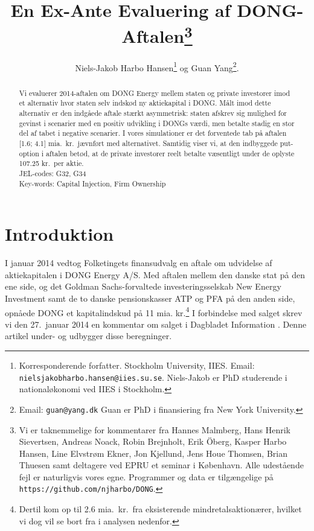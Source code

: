 \documentclass{article}
\title{En Ex-Ante Evaluering af DONG-Aftalen\thanks{Vi er taknemmelige for kommentarer fra Hannes Malmberg, Hans Henrik Sievertsen, Andreas Noack, Robin Brejnholt, Erik {\"O}berg, Kasper Harbo Hansen, Line Elvstrøm Ekner, Jon Kjellund,  Jens Houe Thomsen, Brian Thuesen samt deltagere ved EPRU et seminar i København. Alle udestående fejl er naturligvis vores egne.  Programmer og data er tilgængelige på \texttt{https://github.com/njharbo/DONG}.} \\ }
\author{Niels-Jakob Harbo Hansen\thanks{Korresponderende forfatter. Stockholm University, IIES.  Email: \texttt{nielsjakobharbo.hansen@iies.su.se}. Niels-Jakob er PhD studerende i nationaløkonomi ved IIES i Stockholm.} \hspace{0.1 mm} og Guan Yang\thanks{Email: \texttt{guan@yang.dk} Guan er PhD i finansiering fra New York University.  }. }
\begin{document}
\maketitle

\begin{abstract}
\onehalfspacing
 Vi evaluerer 2014-aftalen om DONG Energy mellem staten og private investorer imod et alternativ hvor staten selv indskød ny aktiekapital i DONG. Målt imod dette alternativ er den indgåede aftale stærkt asymmetrisk: staten afskrev sig mulighed for gevinst i scenarier med en positiv udvikling i DONGs værdi, men betalte stadig en stor del af tabet i negative scenarier. I vores simulationer er det forventede tab på aftalen [1.6; 4.1] mia.\ kr.\ jævnført med alternativet. Samtidig viser vi, at den indbyggede put-option i aftalen betød, at de private investorer reelt betalte væsentligt under de oplyste 107.25 kr.\ per aktie. \\
 JEL-codes: G32, G34 \\
 Key-words: Capital Injection, Firm Ownership
\end{abstract}


\newpage

\section{Introduktion}


I januar 2014 vedtog Folketingets finansudvalg en aftale om udvidelse af aktiekapitalen i DONG Energy A/S. Med aftalen mellem den danske stat på den ene side, og det Goldman Sachs-forvaltede investeringsselskab New Energy Investment samt de to danske pensionskasser ATP og PFA på den anden side, opnåede DONG et kapitalindskud på 11 mia. kr.\footnote{Dertil kom op til 2.6 mia.\ kr.\ fra eksisterende mindretalsaktionærer, hvilket vi dog vil se bort fra i analysen nedenfor.} I forbindelse med salget skrev vi den 27.\ januar 2014 en kommentar om salget i Dagbladet Information \citep{Hansen2014}. Denne artikel under- og udbygger disse beregninger.
\end{document}
